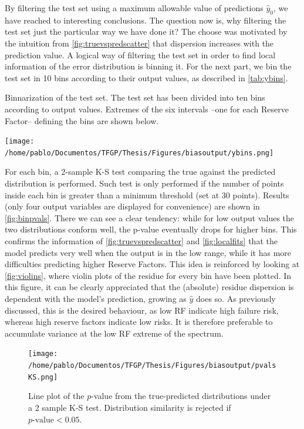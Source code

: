 %
\indent By filtering the test set using a maximum allowable value of predictions $\hat{y}_0$, we have reached to interesting conclusions. The question now is, why filtering the test set just the particular way we have done it? The choose was motivated by the intuition from \autoref{fig:truevspredscatter} that dispersion increases with the prediction value. A logical way of filtering the test set in order to find local information of the error distribution is binning it. For the next part, we bin the test set in 10 bins according to their output values, as described in \autoref{tab:ybins}.\\
%
\begin{table}[!htb]
	\centering
	\caption{Binnarization of the test set. The test set has been divided into ten bins according to output values. Extremes of the six intervals --one for each Reserve Factor-- defining the bins are shown below.}
	\texttt{[image: /home/pablo/Documentos/TFGP/Thesis/Figures/biasoutput/ybins.png]}
	\label{tab:ybins}
\end{table}
%
\indent For each bin, a 2-sample K-S test comparing the true against the predicted distribution is performed. Such test is only performed if the number of points inside each bin is greater than a minimum threshold (set at 30 points). Results (only four output variables are displayed for convenience) are shown in \autoref{fig:binpvals}. There we can see a clear tendency: while for low output values the two distributions conform well, the p-value eventually drops for higher bins. This confirms the information of \autoref{fig:truevspredscatter} and \autoref{fig:localfits} that the model predicts very well when the output is in the low range, while it has more difficulties predicting higher Reserve Factors. This idea is reinforced by looking at \autoref{fig:violins}, where violin plots of the residue for every bin have been plotted. In this figure, it can be clearly appreciated that the (absolute) residue dispersion is dependent with the model's prediction, growing as $\hat{y}$ does so. As previously discussed, this is the desired behaviour, as low RF indicate high failure risk, whereas high reserve factors indicate low risks. It is therefore preferable to accumulate variance at the low RF extreme of the spectrum.\\
%
\begin{figure}[!htb]
	\centering
	\texttt{[image: /home/pablo/Documentos/TFGP/Thesis/Figures/biasoutput/pvalsKS.png]}
	\caption{Line plot of the $p$-value from the true-predicted distributions under a 2 sample K-S test. Distribution similarity is rejected if $p\text{-value}<0.05$.}
	\label{fig:binpvals}
\end{figure}
